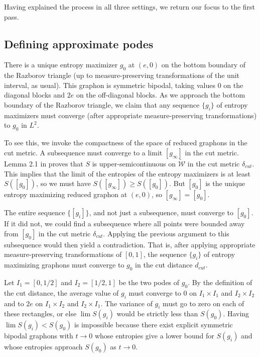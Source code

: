 \documentclass[12pt]{amsart}
\newcommand{\reduced}{\widetilde {\mathcal{W}}}
\begin{document}
{Having explained the 
process in all three settings, we return our focus to the first pass.



\subsection{Defining approximate podes}

There is a unique entropy maximizer $g_0$ at $(e,0)$ on the bottom boundary of the Razborov triangle
(up to measure-preserving transformations of the 
unit interval, as usual). 
This graphon
is symmetric bipodal, taking values 0 on the diagonal blocks and $2e$ on the off-diagonal blocks. As we
approach the bottom boundary of the Razborov triangle, we claim that 
any sequence $\{g_i\}$ of entropy maximizers must converge (after appropriate measure-preserving transformations) 
to $g_0$ in $L^2$. 

To see this, we invoke the compactness of the space of reduced graphons in the cut metric. A subsequence 
must converge to a limit $[g_\infty]$ in the cut metric. 
Lemma 2.1 in \cite{CV} proves that $S$ is upper-semicontinuous on $\reduced$ in the cut metric $\delta_{cut}$. This implies that the limit of the entropies of the entropy maximizers is at least $S([g_0])$, so we must have 
$S([g_\infty]) \ge S([g_0])$. But $[g_0]$ is the unique entropy maximizing reduced graphon at $(e,0)$, so $[g_\infty] = [g_0]$. 

The entire sequence $\{[g_i]\}$, and not just a subsequence, must converge to $[g_0]$. 
If it did not, we could find a subsequence where all points
were bounded away from $[g_0]$ in the cut metric $\delta_{cut}$. Applying the previous argument to this subsequence would then yield
a contradiction. That is, after applying appropriate measure-preserving transformations of $[0,1]$, the sequence 
$\{g_i\}$ of entropy maximizing graphons must converge to $g_0$ in the cut distance $d_{cut}$. 

Let $I_1=[0,1/2]$ and $I_2=[1/2, 1]$ be the two podes of $g_0$. 
By the definition of the cut distance, the average value of $g_i$ must converge 
to 0 on $I_1 \times I_1$ and $I_2 \times I_2$ and to $2e$ on $I_1 \times I_2$ and $I_2 \times I_1$. The variance of $g_i$ 
must go to zero on each of these rectangles, or else $\lim S(g_i)$ would be strictly less than $S(g_0)$. 
Having $\lim S(g_i) < S(g_0)$ is impossible because there exist explicit symmetric bipodal graphons with $t \to 0$ whose entropies give a lower bound for $S(g_i)$ and whose entropies approach $S(g_0)$ as $t \to 0$. 

}
\end{document}
